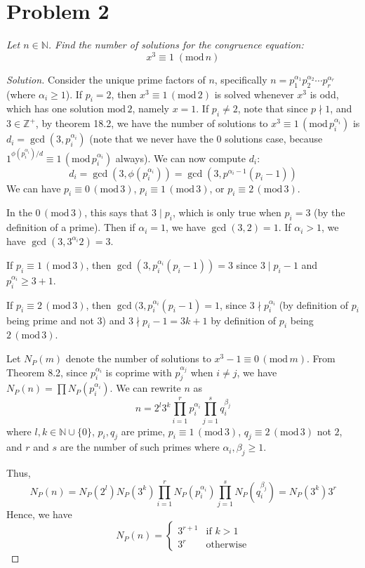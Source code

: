 \documentclass{article}
\newcommand{\N}{{\mathbb N}}
\newcommand{\Z}{{\mathbb Z}}
\begin{document}
\section{Problem 2}
{\it Let $n \in \N$.
Find the number of solutions for the congruence equation:
\[
	x^3 \equiv 1 \; (\mathrm{mod}\, n)
\]
}
\begin{proof}[Solution]\let\qed\relax
	Consider the unique prime factors of $n$,
	specifically $n = p_1^{\alpha_1}p_2^{\alpha_2} \cdots p_r^{\alpha_r}$
	(where $\alpha_i \geq 1$).
	If $p_i = 2$, then $x^3 \equiv 1 \, (\mathrm{mod}\,2)$
	is solved whenever $x^3$ is odd,
	which has one solution $\mathrm{mod}\,2$, namely $x = 1$.
	If $p_i \neq 2$,
	note that since $p \nmid 1$, and $3 \in \Z^+$,
	by theorem 18.2, we have the number of solutions to
	$x^3 \equiv 1 \,(\mathrm{mod}\,p_i^{\alpha_i})$
	is $d_i = \gcd(3,p_i^{\alpha_i})$
	(note that we never have the $0$ solutions case,
	because $1^{\phi(p_i^{\alpha_i})/d} \equiv 1 \, (\mathrm{mod}\,p_i^{\alpha_i})$ always).
	We can now compute $d_i$:
	\[
		d_i = \gcd(3,\phi(p_i^{\alpha_i})) = \gcd(3, p^{\alpha_i-1}(p_i-1))
	\]
	We can have $p_i \equiv 0\, (\mathrm{mod}\, 3)$,
	$p_i \equiv 1\, (\mathrm{mod}\, 3)$,
	or $p_i \equiv 2\, (\mathrm{mod}\, 3)$.

	In the $0\, (\mathrm{mod}\, 3)$, this says that $3 \mid p_i$,
	which is only true when $p_i = 3$ (by the definition of a prime).
	Then if $\alpha_i = 1$, we have $\gcd(3,2) = 1$.
	If $\alpha_i > 1$, we have $\gcd(3,3^{\alpha_i}2) = 3$.

	If $p_i \equiv 1\, (\mathrm{mod}\, 3)$, then
	$\gcd(3,p_i^{\alpha_i}(p_i - 1)) = 3$ since $3 \mid p_i - 1$
	and $p_i^{\alpha_i} \geq 3+1$.
	
	If $p_i \equiv 2\, (\mathrm{mod}\, 3)$,
	then $\gcd(3,p_i^{\alpha_i}(p_i-1) = 1$,
	since $3 \nmid p_i^{\alpha_i}$ (by definition of $p_i$ being prime and not $3$)
	and $3 \nmid p_i - 1 = 3k + 1$
	by definition of $p_i$ being $2\, (\mathrm{mod}\, 3)$.

	Let $N_P(m)$ denote the number of solutions to
	$x^3 - 1 \equiv 0\, (\mathrm{mod}\,m)$.
	From Theorem 8.2, since
	$p_i^{\alpha_i}$ is coprime with $p_j^{\alpha_j}$ when $i \neq j$,
	we have $N_P(n) = \prod N_P(p_i^{\alpha_i})$.
	We can rewrite $n$ as
	\[
		n = 2^l3^k\prod_{i=1}^r p_i^{\alpha_i} \prod_{j=1}^s q_i^{\beta_j}
	\]
	where $l,k \in \N \cup \{0\}$, $p_i,q_j$ are prime,
	$p_i \equiv 1 \, (\mathrm{mod}\,3)$,
	$q_j \equiv 2 \, (\mathrm{mod}\,3)$ not $2$,
	and $r$ and $s$ are the number of such primes where $\alpha_i,\beta_j \geq 1$.

	Thus,
	\[
		N_P(n) = N_P(2^l)N_P(3^k)
		\prod_{i=1}^r N_P(p_i^{\alpha_i}) \prod_{j=1}^s N_P(q_i^{\beta_j})
		= N_P(3^k)3^r
	\]
	Hence, we have
	\[
		N_P(n) = \begin{cases}
			3^{r+1} & \text{if }k>1\\
			3^{r} & \text{otherwise}
		\end{cases}
	\]
\end{proof}
\clearpage
\end{document}
